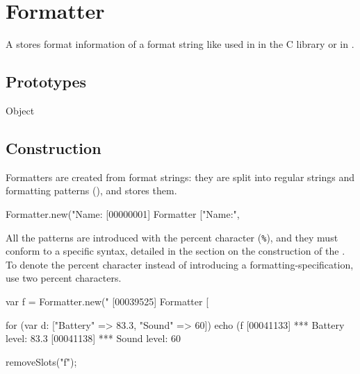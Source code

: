 
\section{Formatter}

A  stores format information of a format string like
used in  in the C library or in .

\subsection{Prototypes}

\begin{refObjects}
\item[Object]
\end{refObjects}

\subsection{Construction}

Formatters are created from format strings: they are split into regular
strings and formatting patterns (), and stores them.

\begin{urbiscript}[firstnumber=1]
Formatter.new("Name:%
[00000001] Formatter ["Name:", %
\end{urbiscript}

All the patterns are introduced with the percent character (\lstinline|%|),
and they must conform to a specific syntax, detailed in the section on the
construction of the .  To denote the percent character
instead of introducing a formatting-specification, use two percent
characters.

\begin{urbiscript}
var f = Formatter.new("%
[00039525] Formatter [%

for (var d: ["Battery" => 83.3, "Sound" => 60])
  echo (f %
[00041133] ***    Battery level: 83.3%
[00041138] ***      Sound level: 60  %
\end{urbiscript}
\begin{urbicomment}
removeSlots("f");
\end{urbicomment}

